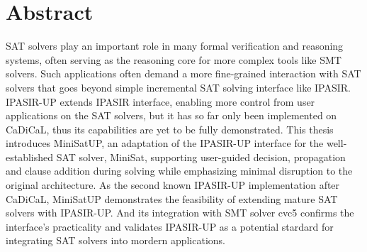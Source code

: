 \chapter*{Abstract}

SAT solvers play an important role in many formal verification and reasoning systems, often serving as the reasoning core for more complex tools like SMT solvers. Such applications often demand a more fine-grained interaction with SAT solvers that goes beyond simple incremental SAT solving interface like IPASIR. IPASIR-UP extends IPASIR interface, enabling more control from user applications on the SAT solvers, but it has so far only been implemented on CaDiCaL, thus its capabilities are yet to be fully demonstrated. This thesis introduces MiniSatUP, an adaptation of the IPASIR-UP interface for the well-established SAT solver, MiniSat, supporting user-guided decision, propagation and clause addition during solving while emphasizing minimal disruption to the original architecture. As the second known IPASIR-UP implementation after CaDiCaL, MiniSatUP demonstrates the feasibility of extending mature SAT solvers with IPASIR-UP. And its integration with SMT solver cvc5 confirms the interface's practicality and validates IPASIR-UP as a potential stardard for integrating SAT solvers into mordern applications.
